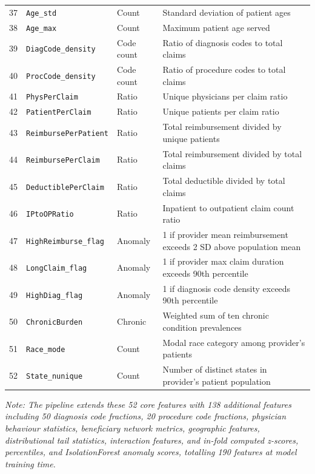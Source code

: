 \begin{longtable}{p{0.8cm}p{4.6cm}p{2.5cm}p{6.0cm}}
37 & \texttt{Age\_std}             & Count     & Standard deviation of patient ages \\
38 & \texttt{Age\_max}             & Count     & Maximum patient age served \\
39 & \texttt{DiagCode\_density}    & Code count & Ratio of diagnosis codes to total claims \\
40 & \texttt{ProcCode\_density}    & Code count & Ratio of procedure codes to total claims \\
41 & \texttt{PhysPerClaim}         & Ratio     & Unique physicians per claim ratio \\
42 & \texttt{PatientPerClaim}      & Ratio     & Unique patients per claim ratio \\
43 & \texttt{ReimbursePerPatient}  & Ratio     & Total reimbursement divided by unique patients \\
44 & \texttt{ReimbursePerClaim}    & Ratio     & Total reimbursement divided by total claims \\
45 & \texttt{DeductiblePerClaim}   & Ratio     & Total deductible divided by total claims \\
46 & \texttt{IPtoOPRatio}          & Ratio     & Inpatient to outpatient claim count ratio \\
47 & \texttt{HighReimburse\_flag}  & Anomaly   & 1 if provider mean reimbursement exceeds 2 SD above population mean \\
48 & \texttt{LongClaim\_flag}      & Anomaly   & 1 if provider max claim duration exceeds 90th percentile \\
49 & \texttt{HighDiag\_flag}       & Anomaly   & 1 if diagnosis code density exceeds 90th percentile \\
50 & \texttt{ChronicBurden}        & Chronic   & Weighted sum of ten chronic condition prevalences \\
51 & \texttt{Race\_mode}           & Count     & Modal race category among provider's patients \\
52 & \texttt{State\_nunique}       & Count     & Number of distinct states in provider's patient population \\
\end{longtable}

\textit{Note: The pipeline extends these 52 core features with 138 additional features including 50 diagnosis code fractions, 20 procedure code fractions, physician behaviour statistics, beneficiary network metrics, geographic features, distributional tail statistics, interaction features, and in-fold computed z-scores, percentiles, and IsolationForest anomaly scores, totalling 190 features at model training time.}
